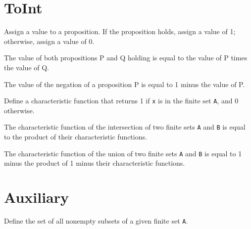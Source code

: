 \section{ToInt}

\begin{definition}\label{toInt}
  \leanok
  Assign a value to a proposition. If the proposition holds, assign a value of 1; otherwise, assign a value of 0.
\end{definition}

\begin{lemma}\label{toInt_and}
  \leanok
  The value of both propositions P and Q holding is equal to the value of P times the value of Q.
\end{lemma}

\begin{lemma}\label{toInt_not}
  \leanok
  The value of the negation of a proposition P is equal to 1 minus the value of P.
\end{lemma}

\begin{definition}\label{char_fun}
  \leanok
  Define a characteristic function that returns 1 if \verb|x| is in the finite set \verb|A|, and 0 otherwise.
\end{definition}

\begin{lemma}\label{char_fun_inter}
  The characteristic function of the intersection of two finite sets \verb|A| and \verb|B| is equal to the product of their characteristic functions.
\end{lemma}

\begin{lemma}\label{char_fun_union}
  The characteristic function of the union of two finite sets \verb|A| and \verb|B| is equal to 1 minus the product of 1 minus their characteristic functions.
\end{lemma}
\section{Auxiliary}

\begin{definition}\label{Finset.powerset₀}
  \leanok
  Define the set of all nonempty subsets of a given finite set \verb|A|.
\end{definition}

